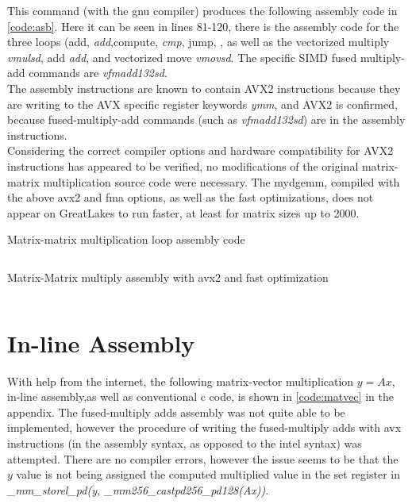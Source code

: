 \documentclass[letterpaper]{article}
\newenvironment{longlisting}{\captionsetup{type=listing}}{}
\newcommand{\code}[4]{
\begin{longlisting}
    \caption{#3}
    \inputminted[linenos]{#1}{#2}
    \label{code:#4}
\end{longlisting}
}
\begin{document}
This command (with the gnu compiler) produces the following assembly code in \cref{code:asb}. Here it can be seen in lines 81-120, there is the assembly code for the three loops (add, \textit{add},compute, \textit{cmp}, jump, , as well as the vectorized multiply \textit{vmulsd}, add \textit{add}, and vectorized move \textit{vmovsd}. The specific SIMD fused multiply-add commands are \textit{vfmadd132sd}. \\

The assembly instructions are known to contain AVX2 instructions because they are writing to the AVX specific register keywords \textit{ymm}, and AVX2 is confirmed, because fused-multiply-add commands (such as \textit{vfmadd132sd}) are in the assembly instructions.\\

Considering the correct compiler options and hardware compatibility for AVX2 instructions has appeared to be verified, no modifications of the original matrix-matrix multiplication source code were necessary. The mydgemm, compiled with the above avx2 and fma options, as well as the fast optimizations, does not appear on GreatLakes to run faster, at least for matrix sizes up to 2000.


\begin{longlisting}
    \caption{Matrix-matrix multiplication loop assembly code}
    \inputminted[linenos,firstline=81,lastline=120]{bash}{figures/dgemm.s}
    \label{code:asb_}
\end{longlisting}


\code{cpp}{figures/dgemm.s}{Matrix-Matrix multiply assembly with avx2 and fast optimization}{asb}






\newpage
\section{In-line Assembly}
With help from the internet, the following matrix-vector multiplication $y=Ax$, in-line assembly,as well as conventional c code, is shown in \cref{code:matvec} in the appendix. The fused-multiply adds assembly was not quite able to be implemented, however the procedure of writing the fused-multiply adds with avx instructions (in the assembly syntax, as opposed to the intel syntax) was attempted. There are no compiler errors, however the issue seems to be that the $y$ value is not being assigned the computed multiplied value in the set register in \textit{\_mm\_storel\_pd(y, \_mm256\_castpd256\_pd128(Ax))}.
\end{document}
